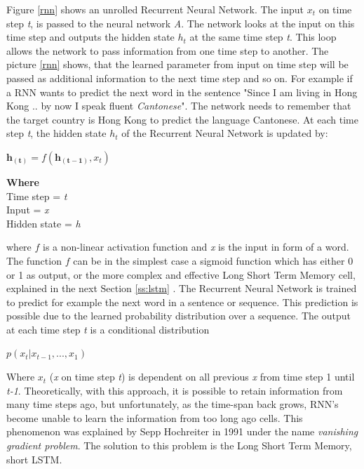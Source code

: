 Figure \ref{rnn} shows an unrolled Recurrent Neural Network. The input \(x_t\) on time step \textit{t}, is passed to the neural network \textit{A}. The network looks at the input on this time step and outputs the hidden state \(h_t\) at the same time step \textit{t}. This loop allows the network to pass information from one time step to another. The picture \ref{rnn} shows, that the learned parameter from input  on time step  will be passed as additional information to the next time step  and so on. For example if a RNN wants to predict the next word in the sentence "Since I am living in Hong Kong .. by now I speak fluent \textit{Cantonese}". The network needs to remember that the target country is Hong Kong to predict the language Cantonese. At each time step \textit{t}, the hidden state \textit{\(h_t\)} of the Recurrent Neural Network is updated by:

\begin{tcolorbox}
	\begin{center}
		\begin{math}
		\boldsymbol{h_{(t)}} = f(\boldsymbol{h_{(t-1)}}, x_{t})
		\end{math}
	\end{center}
\end{tcolorbox}

\begin{tcolorbox}
	\textbf{Where} \\
	Time step = \textit{t} \\
	Input =     \textit{x} \\
	Hidden state = \textit{h} 
\end{tcolorbox}


where \(f\) is a non-linear activation function and \textit{x} is the input in form of a word. The function \(f\) can be in the simplest case a sigmoid function which has either 0 or 1 as output, or the more complex and effective Long Short Term Memory cell, explained in the next Section \ref{ss:lstm} \cite{hochreiter1997long}. The Recurrent Neural Network is trained to predict for example the next word in a sentence or sequence. This prediction is possible due to the learned probability distribution over a sequence. The output at each time step \textit{t} is a conditional distribution

\begin{tcolorbox}
	\begin{center}
	 \(p(x_{t}|x_{t-1},...,x_{1})\)
	\end{center}
\end{tcolorbox}
Where \(x_{t}\) (\textit{x} on time step \textit{t}) is dependent on all previous \textit{x} from time step 1 until \textit{t-1}.
Theoretically, with this approach, it is possible to retain information from many time steps ago, but unfortunately, as the time-span back grows, RNN's become unable to learn the information from too long ago cells. This phenomenon was explained by Sepp Hochreiter in 1991 \cite{Hochreiter:91} under the name \textit{vanishing gradient problem}. The solution to this problem is the Long Short Term Memory, short LSTM.

